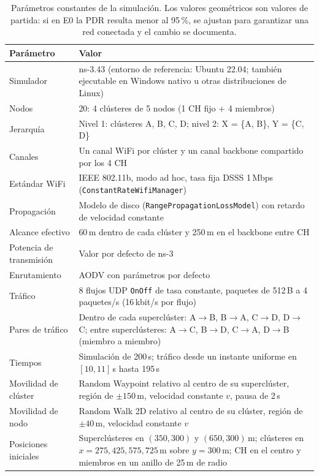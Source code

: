 \begin{table}[h]
\centering
\small
\begin{tabular}{p{4.2cm}p{7.8cm}}
\toprule
\textbf{Parámetro} & \textbf{Valor} \\
\midrule
Simulador & ns-3.43 (entorno de referencia: Ubuntu 22.04; también ejecutable en Windows nativo u otras distribuciones de Linux) \\
Nodos & 20: 4 clústeres de 5 nodos (1 CH fijo + 4 miembros) \\
Jerarquía & Nivel 1: clústeres A, B, C, D; nivel 2: X = \{A, B\}, Y = \{C, D\} \\
Canales & Un canal WiFi por clúster y un canal backbone compartido por los 4 CH \\
Estándar WiFi & IEEE 802.11b, modo ad hoc, tasa fija DSSS 1\,Mbps
(\texttt{ConstantRateWifiManager}) \\
Propagación & Modelo de disco (\texttt{Range\allowbreak{}Propagation\allowbreak{}LossModel}) con retardo de
velocidad constante \\
Alcance efectivo & 60\,m dentro de cada clúster y 250\,m en el backbone entre CH \\
Potencia de transmisión & Valor por defecto de ns-3 \\
Enrutamiento & AODV con parámetros por defecto \\
Tráfico & 8 flujos UDP \texttt{OnOff} de tasa constante, paquetes de 512\,B a
4\,paquetes/s (16\,kbit/s por flujo) \\
Pares de tráfico & Dentro de cada superclúster: A$\rightarrow$B, B$\rightarrow$A,
C$\rightarrow$D, D$\rightarrow$C; entre superclústeres: A$\rightarrow$C,
B$\rightarrow$D, C$\rightarrow$A, D$\rightarrow$B (miembro a miembro) \\
Tiempos & Simulación de 200\,s; tráfico desde un instante uniforme en $[10, 11]$\,s
hasta 195\,s \\
Movilidad de clúster & Random Waypoint relativo al centro de su superclúster, región de
$\pm 150$\,m, velocidad constante $v$, pausa de 2\,s \\
Movilidad de nodo & Random Walk 2D relativo al centro de su clúster, región de
$\pm 40$\,m, velocidad constante $v$ \\
Posiciones iniciales & Superclústeres en $(350, 300)$ y $(650, 300)$\,m; clústeres en
$x = 275, 425, 575, 725$\,m sobre $y = 300$\,m; CH en el centro y miembros en un anillo de
25\,m de radio \\
\bottomrule
\end{tabular}
\caption{Parámetros constantes de la simulación. Los valores geométricos son valores de
partida: si en E0 la PDR resulta menor al 95\,\%, se ajustan para garantizar una red
conectada y el cambio se documenta.}
\label{tab:parametros}
\end{table}

